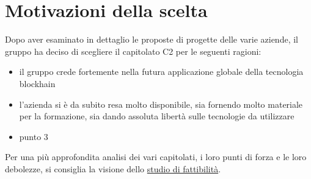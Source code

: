 \section{Motivazioni della scelta}\label{section:motivazioni}

Dopo aver esaminato in dettaglio le proposte di progette delle varie aziende,
 il gruppo ha deciso di scegliere il capitolato C2 per le seguenti ragioni:
\begin{itemize}
    \item il gruppo crede fortemente nella futura applicazione globale della tecnologia blockhain
    \item l'azienda si è da subito resa molto disponibile, sia fornendo molto materiale per la formazione, sia dando assoluta libertà sulle tecnologie da utilizzare
    \item punto 3 
\end{itemize}

Per una più approfondita analisi dei vari capitolati,
 i loro punti di forza e le loro debolezze, si consiglia la visione dello \href{https://yakuzaishi-swe.github.io/docs/docs/studio_fattibilita.pdf}{studio di fattibilità}.